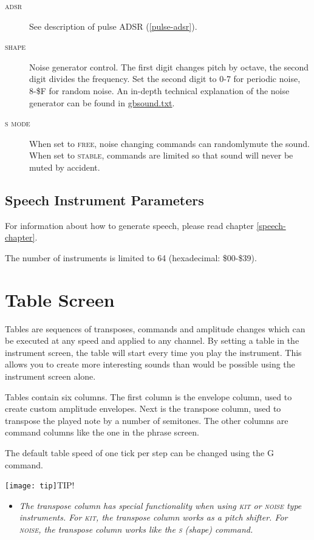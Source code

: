 \begin{description}
	\item[\textsc{adsr}] See description of pulse ADSR (\ref{pulse-adsr}).
	\item[\textsc{shape}] Noise generator control. The first digit changes pitch by octave, the second digit divides the frequency. Set the second digit to 0-7 for periodic noise, 8-\$F for random noise.
        An in-depth technical explanation of the noise generator can be found in \href{http://www.devrs.com/gb/files/hosted/GBSOUND.txt}{gbsound.txt}.
	\item[\textsc{s mode}] When set to \textsc{free}, noise changing commands can randomly\footnotemark mute the sound. When set to \textsc{stable}, commands are limited so that sound will never be muted by accident.
\end{description}

\subsection{Speech Instrument Parameters}

For information about how to generate speech, please read chapter \ref{speech-chapter}.

The number of instruments is limited to 64 (hexadecimal: \$00-\$39).

\section{Table Screen}

Tables are sequences of transposes, commands and amplitude changes which can be executed at any speed and applied to any channel. By setting a table in the instrument screen, the table will start every time you play the instrument. This allows you to create more interesting sounds than would be possible using the instrument screen alone.

Tables contain six columns. The first column is the envelope column, used to create custom amplitude envelopes. Next is the transpose column, used to transpose the played note by a number of semitones. The other columns are command columns like the one in the phrase screen.

The default table speed of one tick per step can be changed using the G command.

\texttt{[image: tip]}TIP!
\begin{itemize}
	\item \textit{The transpose column has special functionality when using \textsc{kit} or \textsc{noise} type instruments. For \textsc{kit}, the transpose column works as a pitch shifter. For \textsc{noise}, the transpose column works like the \textsc{s} (shape) command.}
\end{itemize}

